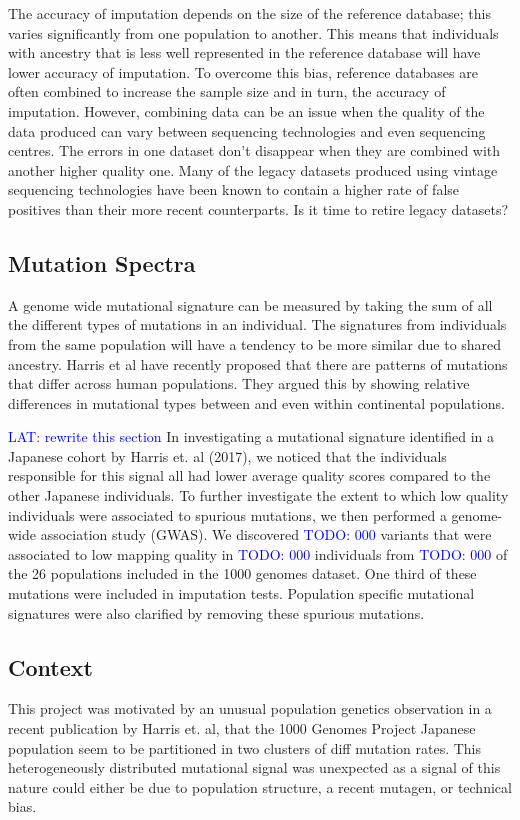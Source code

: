 \documentclass[12pt]{amsart}
\newcommand{\lat}[1]{\textcolor{blue}{LAT: #1}}
\newcommand{\todo}[1]{\textcolor{blue}{TODO: #1}}
\begin{document}
The accuracy of imputation depends on the size of the reference database; this varies significantly from one population to another.
This means that individuals with ancestry that is less well represented in the reference database will have lower accuracy of imputation.
To overcome this bias, reference databases are often combined to increase the sample size and in turn, the accuracy of imputation.
However, combining data can be an issue when the quality of the data produced can vary between sequencing technologies and even sequencing centres.
The errors in one dataset don't disappear when they are combined with another higher quality one. 
Many of the legacy datasets produced using vintage sequencing technologies have been known to contain a higher rate of false positives than their more recent counterparts.
Is it time to retire legacy datasets? 


\subsection{Mutation Spectra} 
A genome wide mutational signature can be measured by taking the sum of all the different types of mutations in an individual. 
The signatures from individuals from the same population will have a tendency to be more similar due to shared ancestry.
Harris et al have recently proposed that there are patterns of mutations that differ across human populations.
They argued this by showing relative differences in mutational types between and even within continental populations.

\lat{rewrite this section}
In investigating a mutational signature identified in a Japanese cohort by Harris et. al (2017), we noticed that the individuals responsible for this signal all had lower average quality scores compared to the other Japanese individuals. 
To further investigate the extent to which low quality individuals were associated to spurious mutations, we then performed a genome-wide association study (GWAS). 
We discovered \todo{000} variants that were associated to low mapping quality in \todo{000} individuals from \todo{000} of the 26 populations included in the 1000 genomes dataset. 
One third of these mutations were included in imputation tests. Population specific mutational signatures were also clarified by removing these spurious mutations.

\subsection{Context}
This project was motivated by an unusual population genetics observation in a recent publication by Harris et. al, that the 1000 Genomes Project Japanese population seem to be partitioned in two clusters of diff mutation rates. 
This heterogeneously distributed mutational signal was unexpected as a signal of this nature could either be due to population structure, a recent mutagen, or technical bias.
\end{document}
